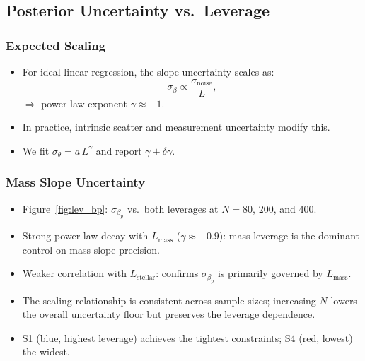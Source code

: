\documentclass[twocolumn]{aastex631}
\begin{document}
\subsection{Posterior Uncertainty vs.\ Leverage}\label{sec:sigma}

\subsubsection{Expected Scaling}\label{sec:expected}

\begin{itemize}
    \item For ideal linear regression, the slope uncertainty scales as:
    \begin{equation}\label{eq:ideal}
        \sigma_{\beta} \propto \frac{\sigma_{\mathrm{noise}}}{L},
    \end{equation}
    $\Rightarrow$ power-law exponent $\gamma \approx -1$.
    \item In practice, intrinsic scatter and measurement uncertainty
          modify this.
    \item We fit $\sigma_\theta = a\, L^{\gamma}$ and report
          $\gamma \pm \delta\gamma$.
\end{itemize}

\subsubsection{Mass Slope Uncertainty}\label{sec:bpsd}

\begin{itemize}
    \item Figure~\ref{fig:lev_bp}: $\sigma_{\beta_p}$ vs.\ both
          leverages at $N=80$, $200$, and $400$.
    \item Strong power-law decay with $L_{\mathrm{mass}}$
          ($\gamma \approx -0.9$): mass leverage is the dominant
          control on mass-slope precision.
    \item Weaker correlation with $L_{\mathrm{stellar}}$: confirms
          $\sigma_{\beta_p}$ is primarily governed by
          $L_{\mathrm{mass}}$.
    \item The scaling relationship is consistent across sample sizes;
          increasing $N$ lowers the overall uncertainty floor but
          preserves the leverage dependence.
    \item S1 (blue, highest leverage) achieves the tightest
          constraints; S4 (red, lowest) the widest.
\end{itemize}
\end{document}
